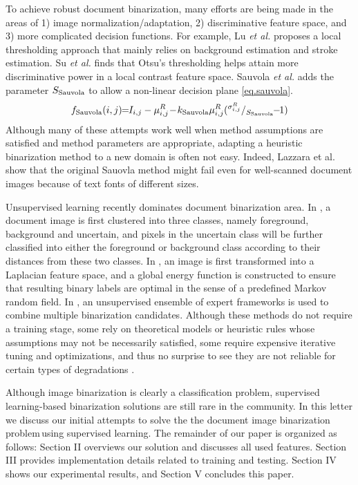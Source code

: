 \documentclass[onecolumn,11pt,draftcls,journal]{IEEEtran}
\def \dibp{the document image binarization problem\,}
\def\etal{{\textit{et al.}}}
\begin{document}
To achieve robust document binarization, many efforts are being made in the areas of 1) image normalization/adaptation, 2) discriminative feature space, and 3) more complicated decision functions. For example, Lu \etal \cite{Lu2010} proposes a local thresholding approach that mainly relies on background estimation and stroke estimation. Su \etal \cite{Su2009,Su2013} finds that Otsu's thresholding helps attain more discriminative power in a local contrast feature space. Sauvola \etal \cite{Sauvola1997,Sauvola2000} adds the parameter $S_{\rm{Sauvola}}$ to allow a non-linear decision plane \eqref{eq.sauvola}.
\begin{equation}
f_{\rm{Sauvola}}(i,j)\!\!=\!\! I_{i,j}-\mu^R_{i,j}\!-\!k_{\rm{Sauvola}}\mu^R_{i,j}(^{\sigma^R_{i,j}}/_{S_{\rm{Sauvola}}} \!\!-\!\!1 )  
\label{eq.sauvola}
\end{equation}
Although many of these attempts work well when method assumptions are satisfied and method parameters are appropriate, adapting a heuristic binarization method to a new domain is often not easy. Indeed, Lazzara et al. \cite{Sauvola2014} show that the original Sauovla method might fail even for well-scanned document images because of text fonts of different sizes. 

Unsupervised learning recently dominates document binarization area. In \cite{Su2012}, a document image is first clustered into three classes, namely foreground, background and uncertain, and pixels in the uncertain class will be further classified into either the foreground or background class according to their distances from these two classes. In \cite{Howe2011,Howe2013}, an image is first transformed into a Laplacian feature space, and a global energy function is constructed to  
ensure that resulting binary labels are optimal in the sense of a predefined Markov random field. In \cite{EoE2012}, an unsupervised ensemble of expert frameworks is used to combine multiple binarization candidates. Although these methods do not require a training stage, some rely on theoretical models or heuristic rules whose assumptions may not be necessarily satisfied, some require expensive iterative tuning and optimizations, and thus no surprise to see they are not reliable for certain types of degradations \cite{Phase2014}. 

Although image binarization is clearly a classification problem, supervised learning-based binarization solutions are still rare in the community. In this letter we discuss our initial attempts to solve the \dibp using supervised learning. The remainder of our paper is organized as follows: Section II overviews our solution and discusses all used features. Section III provides implementation details related to training and testing. Section IV shows our experimental results, and Section V concludes this paper.  
\end{document}
